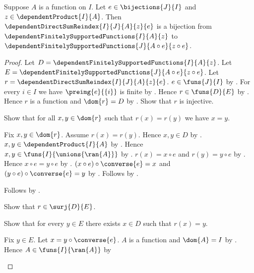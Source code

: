 \begin{theorem}\label{spike_bijective_direct_sum_reindex}
    Suppose $A$ is a function on $I$.
    Let $e\in\bijections{J}{I}$ and
        $z\in\dependentProduct{I}{A}$.
    Then
        $\dependentDirectSumReindex{I}{J}{A}{z}{e}$ is a bijection
        from
            $\dependentFinitelySupportedFunctions{I}{A}{z}$
        to
            $\dependentFinitelySupportedFunctions
                {J}{A\circ e}{z\circ e}$.
\end{theorem}
\begin{proof}
    Let $D=\dependentFinitelySupportedFunctions{I}{A}{z}$.
    Let
        $E=\dependentFinitelySupportedFunctions
            {J}{A\circ e}{z\circ e}$.
    Let $r=\dependentDirectSumReindex{I}{J}{A}{z}{e}$.
    $e\in\funs{J}{I}$ by .
    For every $i\in I$ we have $\preimg{e}{\{i\}}$ is finite by
        .
    Hence $r\in\funs{D}{E}$ by
        .
    Hence $r$ is a function and $\dom{r}=D$ by
        .
    Show that $r$ is injective.
    \begin{subproof}
        Show that for all $x,y\in\dom{r}$ such that $r(x)=r(y)$
            we have $x=y$.
        \begin{subproof}
            Fix $x,y\in\dom{r}$.
            Assume $r(x)=r(y)$.
            Hence $x,y\in D$ by \auto.
            $x,y\in\dependentProduct{I}{A}$ by
                .
            Hence $x,y\in\funs{I}{\unions{\ran{A}}}$ by
                .
            $r(x)=x\circ e$ and $r(y)=y\circ e$ by
                .
            Hence $x\circ e=y\circ e$ by \auto.
            $(x\circ e)\circ\converse{e}=x$ and
                $(y\circ e)\circ\converse{e}=y$ by
                .
            Follows by \auto.
        \end{subproof}
        Follows by .
    \end{subproof}
    Show that $r\in\surj{D}{E}$.
    \begin{subproof}
        Show that for every $y\in E$ there exists $x\in D$
            such that $r(x)=y$.
        \begin{subproof}
            Fix $y\in E$.
            Let $x=y\circ\converse{e}$.
            $A$ is a function and $\dom{A}=I$ by \auto.
            Hence $A\in\funs{I}{\ran{A}}$ by

\end{subproof}
\end{subproof}
\end{proof}
